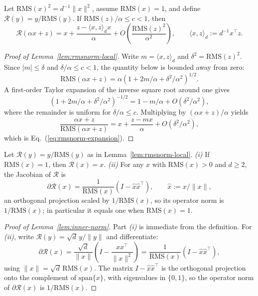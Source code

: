 \documentclass[11pt]{airesearch}
\begin{document}
\begin{lemma}
\label{lem:rmsnorm-local}
Let $\mathrm{RMS}(x)^2=d^{-1}\|x\|^2$, assume $\mathrm{RMS}(x)=1$, and define
$\mathcal{R}(y)=y/\mathrm{RMS}(y)$. If $\mathrm{RMS}(z)/\alpha\le c<1$, then
\begin{equation}
  \mathcal{R}(\alpha x+z)
  =
  x
  +
  \frac{z-\langle x,z\rangle_d x}{\alpha}
  +
  O\left(\frac{\mathrm{RMS}(z)^2}{\alpha^2}\right),
  \qquad
  \langle x,z\rangle_d := d^{-1}x^\top z .
  \label{eq:rmsnorm-expansion}
\end{equation}
\end{lemma}

\begin{proof}[Proof of Lemma~\ref{lem:rmsnorm-local}]
Write $m=\langle x,z\rangle_d$ and
$\delta^2=\mathrm{RMS}(z)^2$. Since $|m|\le\delta$ and
$\delta/\alpha\le c<1$, the quantity below is bounded away from zero:
\[
  \mathrm{RMS}(\alpha x+z)
  =\alpha\left(1+2m/\alpha+\delta^2/\alpha^2\right)^{1/2}.
\]
A first-order Taylor expansion of the inverse square root around one gives
\[
  \left(1+2m/\alpha+\delta^2/\alpha^2\right)^{-1/2}
  =1-m/\alpha+O(\delta^2/\alpha^2),
\]
where the remainder is uniform for $\delta/\alpha\le c$. Multiplying by
$(\alpha x+z)/\alpha$ yields
\[
  \frac{\alpha x+z}{\mathrm{RMS}(\alpha x+z)}
  =x+\frac{z-mx}{\alpha}+O(\delta^2/\alpha^2),
\]
which is Eq.~(\ref{eq:rmsnorm-expansion}).
\end{proof}

\begin{lemma}
\label{lem:inner-norm}
Let $\mathcal{R}(y)=y/\mathrm{RMS}(y)$ as in Lemma~\ref{lem:rmsnorm-local}.
\emph{(i)} If $\mathrm{RMS}(x)=1$, then $\mathcal{R}(x)=x$.
\emph{(ii)} For any $x$ with $\mathrm{RMS}(x)>0$ and $d\ge 2$, the Jacobian
of $\mathcal{R}$ is
\[
  \partial\mathcal{R}(x)
  =
  \frac{1}{\mathrm{RMS}(x)}
  \left(I-\hat{x}\hat{x}^{\top}\right),
  \qquad
  \hat{x}:=x/\|x\|,
\]
an orthogonal projection scaled by $1/\mathrm{RMS}(x)$, so its operator norm
is $1/\mathrm{RMS}(x)$; in particular it equals one when
$\mathrm{RMS}(x)=1$.
\end{lemma}

\begin{proof}[Proof of Lemma~\ref{lem:inner-norm}]
Part \emph{(i)} is immediate from the definition. For \emph{(ii)}, write
$\mathcal{R}(y)=\sqrt{d}\,y/\|y\|$ and differentiate:
\[
  \partial\mathcal{R}(x)
  =
  \frac{\sqrt{d}}{\|x\|}
  \left(I-\frac{x x^{\top}}{\|x\|^{2}}\right)
  =
  \frac{1}{\mathrm{RMS}(x)}
  \left(I-\hat{x}\hat{x}^{\top}\right),
\]
using $\|x\|=\sqrt{d}\,\mathrm{RMS}(x)$. The matrix
$I-\hat{x}\hat{x}^{\top}$ is the orthogonal projection onto the complement of
$\mathrm{span}\{x\}$, with eigenvalues in $\{0,1\}$, so the operator norm of
$\partial\mathcal{R}(x)$ is $1/\mathrm{RMS}(x)$.
\end{proof}
\end{document}
